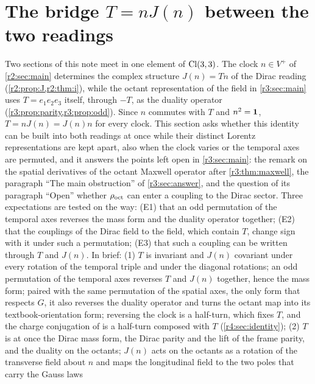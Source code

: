 \section{\texorpdfstring{The bridge $T=nJ(n)$ between the two readings}{The bridge T = nJ(n) between the two readings}}
\label{r4:sec:main}

Two sections of this note meet in one element of $\mathrm{Cl}(3,3)$. The clock $n\in V^+$ of \cref{r2:sec:main} determines the complex structure
$J(n)=Tn$ of the Dirac reading (\cref{r2:prop:J,r2:thm:i}), while the octant representation of the field in \cref{r3:sec:main} uses $T=e_1e_2e_3$
itself, through $-T$, as the duality operator (\cref{r3:prop:parity,r3:prop:odd}). Since $n$ commutes with $T$ and $n^2=\mathbf 1$,
$T=nJ(n)=J(n)n$ for every clock. This section asks whether this identity can be built into both readings at once while their distinct
Lorentz representations are kept apart, also when the clock varies or the temporal axes are permuted, and it answers the points left open
in \cref{r3:sec:main}: the remark on the spatial derivatives of the octant Maxwell operator after \cref{r3:thm:maxwell}, the paragraph ``The
main obstruction'' of \cref{r3:sec:answer}, and the question of its paragraph ``Open'' whether $\rho_{\rm oct}$ can enter a coupling to the Dirac
sector. Three expectations are tested on the way: (E1) that an odd permutation of the temporal axes reverses the mass form and the duality
operator together; (E2) that the couplings of the Dirac field to the field, which contain $T$, change sign with it under such a permutation;
(E3) that such a coupling can be written through $T$ and $J(n)$. In brief:
(1) $T$ is invariant and $J(n)$ covariant under every rotation of the temporal triple and under the diagonal rotations; an odd permutation of the
temporal axes reverses $T$ and $J(n)$ together, hence the mass form; paired with the same permutation of the spatial axes, the only form that
respects $G$, it also reverses the duality operator and turns the octant map into its textbook-orientation form; reversing the clock is a
half-turn, which fixes $T$, and the charge conjugation of \cite{ES17,RE} is a half-turn composed with $T$ (\cref{r4:sec:identity});
(2) $T$ is at once the Dirac mass form, the Dirac parity and the lift of the frame parity, and the duality on the octants; $J(n)$ acts on the
octants as a rotation of the transverse field about $n$ and maps the longitudinal field to the two poles that carry the Gauss laws
